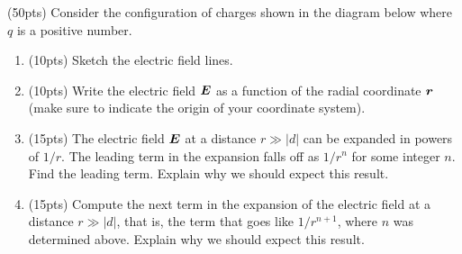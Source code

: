 \documentclass{article}
\begin{document}
\begin{problem}
(50pts) Consider the configuration of charges shown in the diagram below where $q$ is a positive number.

\begin{center}
\end{center}

\begin{enumerate}[label=(\alph*)]
	\item (10pts) Sketch the electric field lines.
	\item (10pts) Write the electric field $\boldsymbol{E}$ as a function of the radial coordinate $\boldsymbol{r}$ (make sure to indicate the origin of your coordinate system).
	\item (15pts) The electric field $\boldsymbol{E}$ at a distance $r \gg |d|$ can be expanded in powers of $1/r$. The leading term in the expansion falls off as $1/r^n$ for some integer $n$. Find the leading term. Explain why we should expect this result.
	\item (15pts) Compute the next term in the expansion of the electric field at a distance $r \gg |d|$, that is, the term that goes like $1/r^{n+1}$, where $n$ was determined above. Explain why we should expect this result.
\end{enumerate}
\end{problem}
\end{document}
